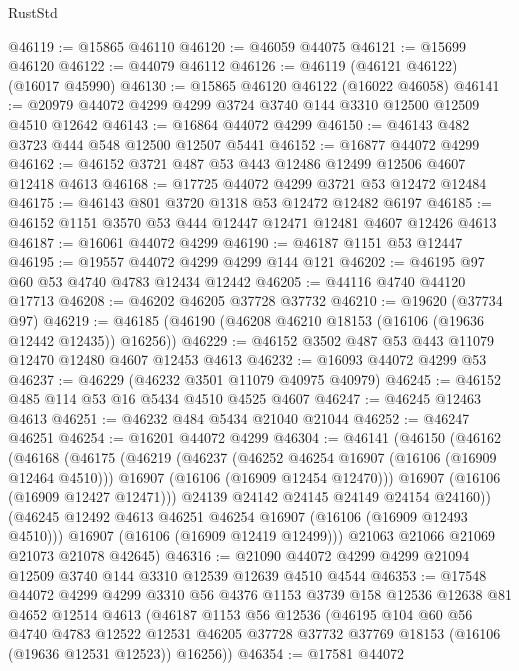 \begin{lexlean}{RustStd}
\begin{coremodule}
@46119 := @15865 @46110
@46120 := @46059 @44075
@46121 := @15699 @46120
@46122 := @44079 @46112
@46126 := @46119 (@46121 @46122) (@16017 @45990)
@46130 := @15865 @46120 @46122 (@16022 @46058)
@46141 := @20979 @44072 @4299 @4299 @3724 @3740 @144 @3310 @12500 @12509 @4510 @12642
@46143 := @16864 @44072 @4299
@46150 := @46143 @482 @3723 @444 @548 @12500 @12507 @5441
@46152 := @16877 @44072 @4299
@46162 := @46152 @3721 @487 @53 @443 @12486 @12499 @12506 @4607 @12418 @4613
@46168 := @17725 @44072 @4299 @3721 @53 @12472 @12484
@46175 := @46143 @801 @3720 @1318 @53 @12472 @12482 @6197
@46185 := @46152 @1151 @3570 @53 @444 @12447 @12471 @12481 @4607 @12426 @4613
@46187 := @16061 @44072 @4299
@46190 := @46187 @1151 @53 @12447
@46195 := @19557 @44072 @4299 @4299 @144 @121
@46202 := @46195 @97 @60 @53 @4740 @4783 @12434 @12442
@46205 := @44116 @4740 @44120 @17713
@46208 := @46202 @46205 @37728 @37732
@46210 := @19620 (@37734 @97)
@46219 := @46185 (@46190 (@46208 @46210 @18153 (@16106 (@19636 @12442 @12435)) @16256))
@46229 := @46152 @3502 @487 @53 @443 @11079 @12470 @12480 @4607 @12453 @4613
@46232 := @16093 @44072 @4299 @53
@46237 := @46229 (@46232 @3501 @11079 @40975 @40979)
@46245 := @46152 @485 @114 @53 @16 @5434 @4510 @4525 @4607
@46247 := @46245 @12463 @4613
@46251 := @46232 @484 @5434 @21040 @21044
@46252 := @46247 @46251
@46254 := @16201 @44072 @4299
@46304 := @46141
    (@46150
      (@46162
        (@46168
          (@46175
            (@46219
              (@46237
                (@46252 @46254 @16907 (@16106 (@16909 @12464 @4510)))
                @16907
                (@16106 (@16909 @12454 @12470)))
              @16907
              (@16106 (@16909 @12427 @12471)))
            @24139
            @24142
            @24145
            @24149
            @24154
            @24160))
        (@46245 @12492 @4613 @46251 @46254 @16907 (@16106 (@16909 @12493 @4510)))
        @16907
        (@16106 (@16909 @12419 @12499)))
      @21063
      @21066
      @21069
      @21073
      @21078
      @42645)
@46316 := @21090 @44072 @4299 @4299 @21094 @12509 @3740 @144 @3310 @12539 @12639 @4510 @4544
@46353 := @17548
    @44072
    @4299
    @4299
    @3310
    @56
    @4376
    @1153
    @3739
    @158
    @12536
    @12638
    @81
    @4652
    @12514
    @4613
    (@46187
      @1153
      @56
      @12536
      (@46195
        @104
        @60
        @56
        @4740
        @4783
        @12522
        @12531
        @46205
        @37728
        @37732
        @37769
        @18153
        (@16106 (@19636 @12531 @12523))
        @16256))
@46354 := @17581 @44072

\end{coremodule}
\end{lexlean}

